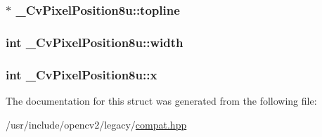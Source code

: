 \hypertarget{struct__CvPixelPosition8u_a11bc495a5f8fdcfd6bf5490268fe8581}{
\subsubsection[{topline}]{$\ast$ \-\_\-\-Cv\-Pixel\-Position8u\-::topline}}\label{struct__CvPixelPosition8u_a11bc495a5f8fdcfd6bf5490268fe8581}
\hypertarget{struct__CvPixelPosition8u_a0c55ef48b276bdf2ed3aa126a42bab12}{
\subsubsection[{width}]{\setlength{\rightskip}{0pt plus 5cm}int \-\_\-\-Cv\-Pixel\-Position8u\-::width}}\label{struct__CvPixelPosition8u_a0c55ef48b276bdf2ed3aa126a42bab12}
\hypertarget{struct__CvPixelPosition8u_ad52f7663e0fd0e8f9867dd168ae8ecc2}{
\subsubsection[{x}]{\setlength{\rightskip}{0pt plus 5cm}int \-\_\-\-Cv\-Pixel\-Position8u\-::x}}\label{struct__CvPixelPosition8u_ad52f7663e0fd0e8f9867dd168ae8ecc2}


The documentation for this struct was generated from the following file\-:\begin{DoxyCompactItemize}
\item 
/usr/include/opencv2/legacy/\hyperlink{compat_8hpp}{compat.\-hpp}\end{DoxyCompactItemize}
